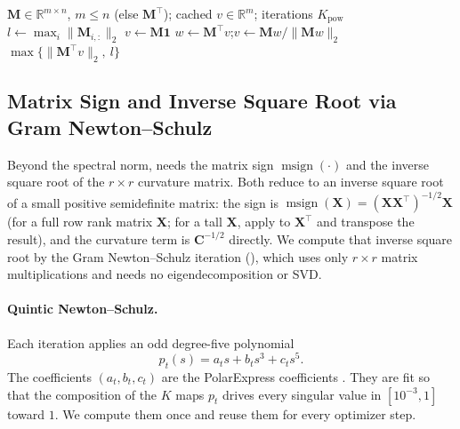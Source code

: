 \documentclass[11pt]{article}
\newcommand{\mat}[1]{\bm{#1}}
\DeclareMathOperator{\msign}{msign}          %
\newcommand{\norm}[1]{\| #1\|}
\begin{document}
\begin{algorithm}[ht]
\caption{Guarded spectral-norm estimate of $\norm{\mat{M}}_2$}
\label{alg:smax}
\begin{algorithmic}[1]
\Require $\mat{M}\in\mathbb{R}^{m\times n}$, $m\le n$ (else $\mat{M}^\top$); cached $v\in\mathbb{R}^m$; iterations $K_{\mathrm{pow}}$
\State $l \gets \max_i\norm{\mat{M}_{i,:}}_2$
 
  \State $v\gets \mat{M}\mathbf{1}$
\EndIf
{} \Comment{iterate the smaller Gram $\mat{M}\mat{M}^\top$}
  \State $w\gets \mat{M}^\top v$;\quad $v\gets \mat{M}w/\norm{\mat{M}w}_2$
\EndFor
\State \Return $\max\big\{\norm{\mat{M}^\top v}_2,\ l\big\}$
\end{algorithmic}
\end{algorithm}

\subsection{Matrix Sign and Inverse Square Root via Gram Newton--Schulz}
\label{app:gramns}

Beyond the spectral norm,  needs the matrix sign $\msign(\cdot)$
and the inverse square root of the $r \times r$ curvature matrix.  Both reduce to
an inverse square root of a small positive semidefinite matrix: the sign is
$\msign(\mat{X})=(\mat{X}\mat{X}^\top)^{-1/2}\mat{X}$ (for a full row rank matrix $\mat{X}$; for a tall $\mat{X}$, apply to $\mat{X}^\top$ and transpose the result), and the curvature term is $\mat{C}^{-1/2}$ directly.  We
compute that inverse square root by the Gram Newton--Schulz iteration
\cite{gram_ns} (), which uses only $r\times r$ matrix
multiplications and needs no eigendecomposition or SVD.

\paragraph{Quintic Newton--Schulz.}
Each iteration applies an odd degree-five polynomial
\begin{equation}\label{e-gram-ns-poly}
    p_t(s)
    =
    a_t s + b_t s^3 + c_t s^5 .
\end{equation}
The coefficients $(a_t,b_t,c_t)$ are the PolarExpress coefficients
\cite{polarexpress}. They are fit so that the composition of the $K$ maps
$p_t$ drives every singular value in $[10^{-3},1]$ toward $1$. We compute
them once and reuse them for every optimizer step.
\end{document}

